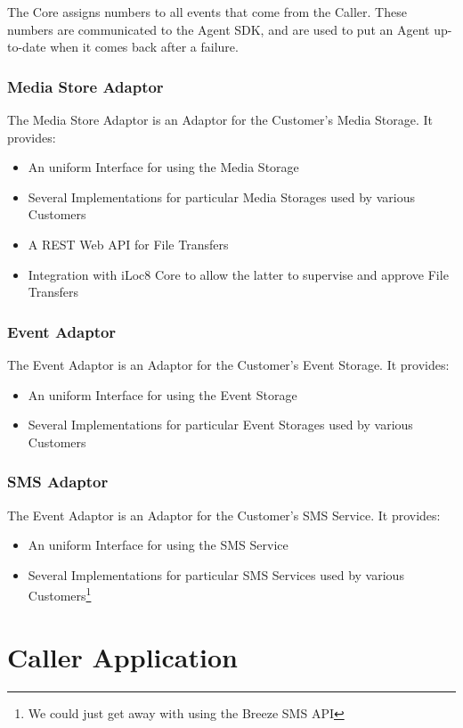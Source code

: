 \documentclass{article}
\begin{document}
	The Core assigns numbers to all events that come from the Caller.
	These numbers are communicated to the Agent SDK, and are used to put an Agent up-to-date when it comes back after a failure.
	
	\subsubsection{Media Store Adaptor}
	
	The Media Store Adaptor is an Adaptor for the Customer's Media Storage. It provides:
	\begin{itemize}
		\item An uniform Interface for using the Media Storage
		\item Several Implementations for particular Media Storages used by various Customers
		\item A REST Web API for File Transfers
		\item Integration with iLoc8 Core to allow the latter to supervise and approve File Transfers
	\end{itemize}
	
	\subsubsection{Event Adaptor}
	
	The Event Adaptor is an Adaptor for the Customer's Event Storage. It provides:
	\begin{itemize}
		\item An uniform Interface for using the Event Storage
		\item Several Implementations for particular Event Storages used by various Customers
	\end{itemize}

	\subsubsection{SMS Adaptor}
	
	The Event Adaptor is an Adaptor for the Customer's SMS Service. It provides:
	\begin{itemize}
		\item An uniform Interface for using the SMS Service
		\item Several Implementations for particular SMS Services used by various Customers\footnote{We could just get away with using the Breeze SMS API}
	\end{itemize}

	\section{Caller Application}
\end{document}
